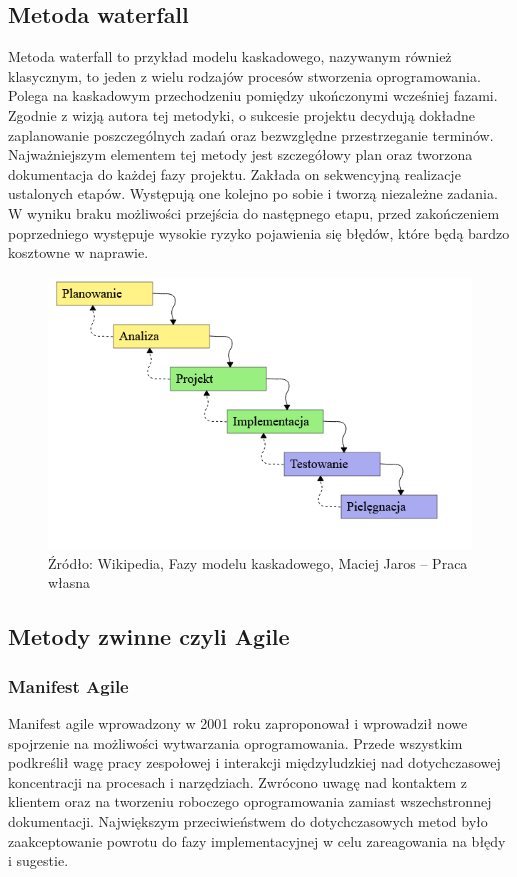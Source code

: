 \documentclass[oneside,polski,logo]{amuthesis}
\begin{document}
\subsection {Metoda waterfall}
Metoda waterfall to przykład modelu kaskadowego, nazywanym również klasycznym, to jeden z wielu rodzajów procesów stworzenia oprogramowania. Polega na kaskadowym przechodzeniu pomiędzy ukończonymi wcześniej fazami. Zgodnie z wizją autora tej metodyki, o sukcesie projektu decydują dokładne zaplanowanie poszczególnych zadań oraz bezwzględne przestrzeganie terminów. Najważniejszym elementem tej metody jest szczegółowy plan oraz tworzona dokumentacja do każdej fazy projektu. Zakłada on sekwencyjną realizacje ustalonych etapów. Występują one kolejno po sobie i tworzą niezależne zadania. W wyniku braku możliwości przejścia do następnego etapu, przed zakończeniem poprzedniego występuje wysokie ryzyko pojawienia się błędów, które będą bardzo kosztowne w naprawie.\cite{waterfall}\\


\begin{figure}[h]
	\centering
	\includegraphics[width=15cm]{images/hyps/waterfall.png}
	\caption{Źródło: Wikipedia, Fazy modelu kaskadowego, Maciej Jaros – Praca własna}
\end{figure}

\subsection{Metody zwinne czyli Agile}

\subsubsection{Manifest Agile}
Manifest agile wprowadzony w 2001 roku zaproponował i wprowadził nowe spojrzenie na możliwości wytwarzania oprogramowania. Przede wszystkim podkreślił wagę pracy zespołowej i interakcji międzyludzkiej nad dotychczasowej koncentracji na procesach i narzędziach. Zwrócono uwagę nad kontaktem z klientem oraz na tworzeniu roboczego oprogramowania zamiast wszechstronnej dokumentacji. Największym przeciwieństwem do dotychczasowych metod było zaakceptowanie powrotu do fazy implementacyjnej w celu zareagowania na błędy i sugestie.\cite{agile}\cite{agile2}\\ \\
\end{document}
